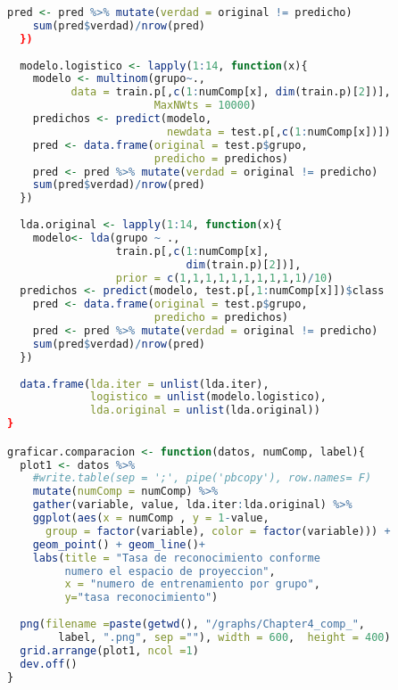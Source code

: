 \begin{lstlisting}[language=R, basicstyle=\small]
    pred <- pred %>% mutate(verdad = original != predicho)
    sum(pred$verdad)/nrow(pred)
  })
  
  modelo.logistico <- lapply(1:14, function(x){
    modelo <- multinom(grupo~., 
          data = train.p[,c(1:numComp[x], dim(train.p)[2])],
                       MaxNWts = 10000)
    predichos <- predict(modelo, 
                         newdata = test.p[,c(1:numComp[x])])
    pred <- data.frame(original = test.p$grupo, 
                       predicho = predichos)
    pred <- pred %>% mutate(verdad = original != predicho)
    sum(pred$verdad)/nrow(pred)
  })
  
  lda.original <- lapply(1:14, function(x){
    modelo<- lda(grupo ~ ., 
                 train.p[,c(1:numComp[x], 
                            dim(train.p)[2])], 
                 prior = c(1,1,1,1,1,1,1,1,1,1)/10)
  predichos <- predict(modelo, test.p[,1:numComp[x]])$class
    pred <- data.frame(original = test.p$grupo, 
                       predicho = predichos)
    pred <- pred %>% mutate(verdad = original != predicho)
    sum(pred$verdad)/nrow(pred)
  })
  
  data.frame(lda.iter = unlist(lda.iter), 
             logistico = unlist(modelo.logistico), 
             lda.original = unlist(lda.original))
}

graficar.comparacion <- function(datos, numComp, label){
  plot1 <- datos %>% 
    #write.table(sep = ';', pipe('pbcopy'), row.names= F)
    mutate(numComp = numComp) %>% 
    gather(variable, value, lda.iter:lda.original) %>% 
    ggplot(aes(x = numComp , y = 1-value, 
      group = factor(variable), color = factor(variable))) +
    geom_point() + geom_line()+
    labs(title = "Tasa de reconocimiento conforme 
         numero el espacio de proyeccion", 
         x = "numero de entrenamiento por grupo", 
         y="tasa reconocimiento")
  
  png(filename =paste(getwd(), "/graphs/Chapter4_comp_", 
        label, ".png", sep =""), width = 600,  height = 400)
  grid.arrange(plot1, ncol =1)
  dev.off()
}
\end{lstlisting}


